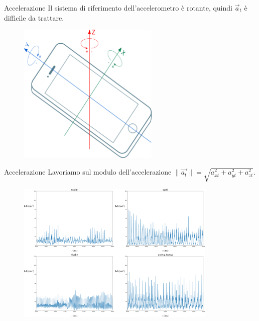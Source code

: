 \documentclass{beamer}
\begin{document}
\begin{frame}{Accelerazione} %
Il sistema di riferimento dell'accelerometro è rotante, quindi $\vec{a}_t$ è difficile da trattare.
\begin{figure}[H]
\includegraphics[width=0.6\textwidth]{../figure/sensor_coordinate_system.png}
\end{figure}

\end{frame}
\begin{frame}{Accelerazione}
Lavoriamo sul modulo dell'accelerazione $\|\vec{a_t}\| =\sqrt{a_{xt}^2+a_{yt}^2+a_{zt}^2}$.
\pause
\begin{figure}[H]
\includegraphics[width=0.85\textwidth]{../figure/espl.png}
\end{figure}
\end{frame}
\end{document}
